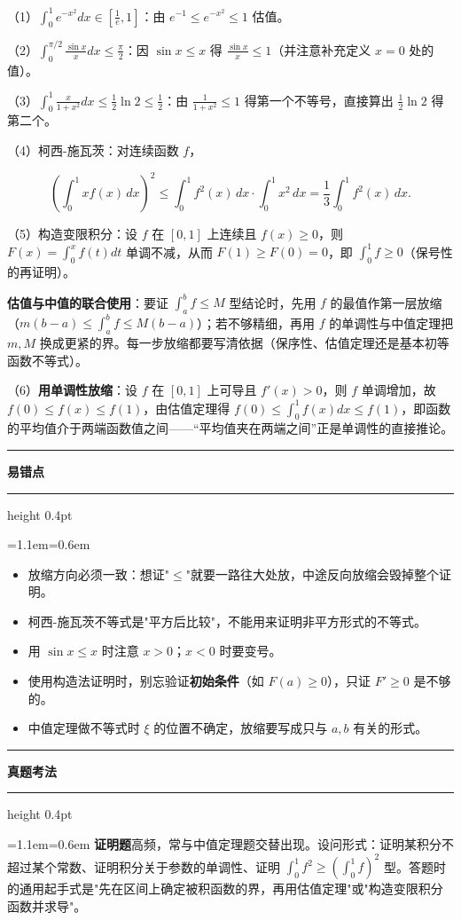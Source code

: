 \documentclass[11pt,openany,UTF8]{ctexbook}
\newcommand{\callouthead}[2]{%
  \par\addvspace{7pt}\noindent
  {\color{#1}\rule[-0.15em]{3pt}{1.05em}}\hspace{0.5em}%
  {\bfseries\color{#1}#2}\par\nobreak\vspace{-0.35em}%
  {\color{rulesep}\hrule height 0.4pt}\nobreak\vspace{0.45em}%
  \begingroup\small\setlength{\parindent}{0pt}%
  \leftskip=1.1em\rightskip=0.6em\noindent\ignorespaces}
\newcommand{\calloutend}{\par\endgroup\addvspace{7pt}}
\newenvironment{callwarn}[1]{\callouthead{warnbar}{#1}}{\calloutend}
\newenvironment{callexam}[1]{\callouthead{exambar}{#1}}{\calloutend}
\begin{document}
（1）$\displaystyle\int_0^1e^{-x^2}dx\in\left[\frac{1}{e},1\right]$：由 $e^{-1}\leq e^{-x^2}\leq1$ 估值。

（2）$\displaystyle\int_0^{\pi/2}\frac{\sin x}{x}dx\leq\frac{\pi}{2}$：因 $\sin x\leq x$ 得 $\frac{\sin x}{x}\leq1$（并注意补充定义 $x=0$ 处的值）。

（3）$\displaystyle\int_0^1\frac{x}{1+x^2}dx\leq\frac{1}{2}\ln 2\leq\frac{1}{2}$：由 $\frac{1}{1+x^2}\leq1$ 得第一个不等号，直接算出 $\frac{1}{2}\ln2$ 得第二个。

（4）柯西-施瓦茨：对连续函数 $f$，

\[\left(\int_0^1xf(x)\,dx\right)^2\leq\int_0^1f^2(x)\,dx\cdot\int_0^1x^2\,dx=\frac{1}{3}\int_0^1f^2(x)\,dx.\]

（5）构造变限积分：设 $f$ 在 $[0,1]$ 上连续且 $f(x)\geq0$，则 $F(x)=\int_0^xf(t)dt$ 单调不减，从而 $F(1)\geq F(0)=0$，即 $\int_0^1f\geq0$（保号性的再证明）。

\textbf{估值与中值的联合使用}：要证 $\int_a^bf\leq M$ 型结论时，先用 $f$ 的最值作第一层放缩（$m(b-a)\leq\int_a^bf\leq M(b-a)$）；若不够精细，再用 $f$ 的单调性与中值定理把 $m,M$ 换成更紧的界。每一步放缩都要写清依据（保序性、估值定理还是基本初等函数不等式）。

（6）\textbf{用单调性放缩}：设 $f$ 在 $[0,1]$ 上可导且 $f'(x)>0$，则 $f$ 单调增加，故 $f(0)\leq f(x)\leq f(1)$，由估值定理得 $f(0)\leq\int_0^1f(x)dx\leq f(1)$，即函数的平均值介于两端函数值之间——“平均值夹在两端之间”正是单调性的直接推论。

\begin{callwarn}{易错点}
\begin{itemize}
\item 放缩方向必须一致：想证"$\leq$"就要一路往大处放，中途反向放缩会毁掉整个证明。
\item 柯西-施瓦茨不等式是"平方后比较"，不能用来证明非平方形式的不等式。
\item 用 $\sin x\leq x$ 时注意 $x>0$；$x<0$ 时要变号。
\item 使用构造法证明时，别忘验证\textbf{初始条件}（如 $F(a)\geq0$），只证 $F'\geq0$ 是不够的。
\item 中值定理做不等式时 $\xi$ 的位置不确定，放缩要写成只与 $a,b$ 有关的形式。
\end{itemize}
\end{callwarn}

\begin{callexam}{真题考法}
\textbf{证明题}高频，常与中值定理题交替出现。设问形式：证明某积分不超过某个常数、证明积分关于参数的单调性、证明 $\int_0^1f^2\geq\left(\int_0^1f\right)^2$ 型。答题时的通用起手式是"先在区间上确定被积函数的界，再用估值定理"或"构造变限积分函数并求导"。

\end{callexam}
\end{document}
